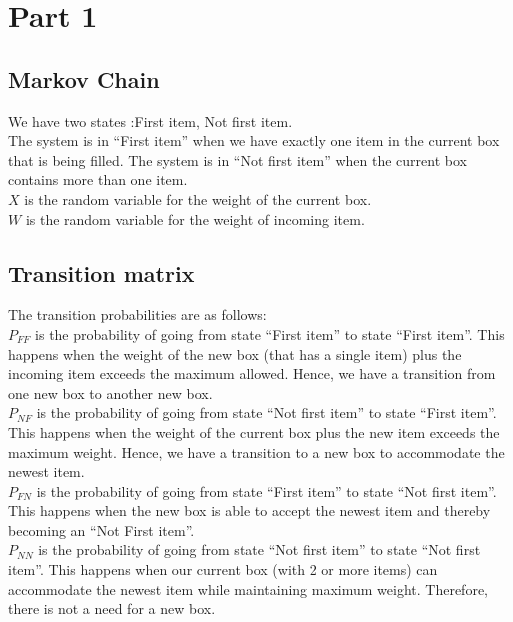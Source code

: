 \documentclass[10pt,a4paper]{article}
\begin{document}
\section{Part 1}
\subsection*{Markov Chain}
We have two states :{First item, Not first item}. \\
The system is in ``First item'' when we have exactly one item in the current box that is being filled. The system is in ``Not first item'' when the current box contains more than one item.\\
$ X $ is the random variable for the weight of the current box.\\
$ W $ is the random variable for the weight of incoming item.\\

\subsection*{Transition matrix}
The transition probabilities are as follows:\\
$ P_{FF} $ is the probability of going from state ``First item'' to state ``First item''. This happens when the weight of the new box (that has a single item) plus the incoming item exceeds the maximum allowed. Hence, we have a transition from one new box to another new box.\\
$ P_{NF} $ is the probability of going from state ``Not first item'' to state ``First item''. This happens when the weight of the current box plus the new item exceeds the maximum weight. Hence, we have a transition to a new box to accommodate the newest item.\\
$ P_{FN} $ is the probability of going from state ``First item'' to state ``Not first item''. This happens when the new box is able to accept the newest item and thereby becoming an ``Not First item''.\\
$ P_{NN} $ is the probability of going from state ``Not first item'' to state ``Not first item''. This happens when our current box (with 2 or more items) can accommodate the newest item while maintaining maximum weight. Therefore, there is not a need for a new box. \\
\end{document}
